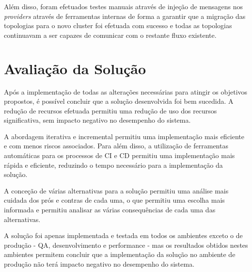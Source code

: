 Além disso, foram efetuados testes manuais através de injeção de mensagens nos \textit{providers}
através de ferramentas internas de forma a garantir que a migração das topologias para o novo
\gls{cluster} foi efetuada com sucesso e todas as topologias continuavam a ser capazes de comunicar
com o restante fluxo existente.

\section{Avaliação da Solução}

Após a implementação de todas as alterações necessárias para atingir os objetivos propostos, é
possível concluir que a solução desenvolvida foi bem sucedida. A redução de recursos efetuada
permitiu uma redução de uso dos recursos significativa, sem impacto negativo no desempenho do sistema.

A abordagem iterativa e incremental permitiu uma implementação mais eficiente e com menos riscos
associados. Para além disso, a utilização de ferramentas automáticas para os processos de \ac{CI} e
\ac{CD} permitiu uma implementação mais rápida e eficiente, reduzindo o tempo necessário para a 
implementação da solução.

A conceção de várias alternativas para a solução permitiu uma análise mais cuidada dos prós e contras
de cada uma, o que permitiu uma escolha mais informada e permitiu analisar as várias consequências
de cada uma das alternativas.

A solução foi apenas implementada e testada em todos os ambientes exceto o de produção - \ac{QA},
desenvolvimento e performance - mas os resultados obtidos nestes ambientes permitem concluir que a
implementação da solução no ambiente de produção não terá impacto negativo no desempenho do sistema.

